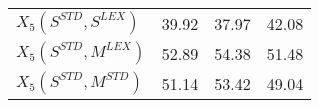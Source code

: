 \begin{table}[]
\begin{tabular}{@{\makebox[1.50em][l]{\rownumber\space}}lccc@{}}
%
$X_5(S^{STD}, S^{LEX})$      & 39.92           & 37.97           & 42.08           \\
$X_5(S^{STD}, M^{LEX})$  & 52.89           & 54.38            & 51.48           \\ 
$X_5(S^{STD}, M^{STD})$  &51.14	&53.42	&49.04            \\  \bottomrule

% 


\end{tabular}
\end{table}
